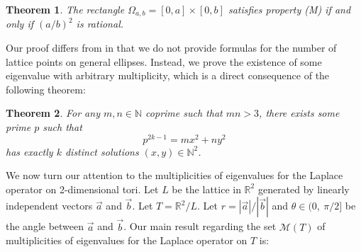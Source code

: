 \documentclass[11pt]{amsart}
\newtheorem{theorem}{Theorem}[section]
\theoremstyle{definition}
\def\sm{{\mathcal M}}
\def\R{{\mathbb R}}
\begin{document}
\begin{theorem}\label{M}
    The rectangle $\Omega_{a, b}=[0,a]\times[0,b]$ satisfies property (M) if and only if $(a/b)^2$ is rational.
\end{theorem}

Our proof differs from \cite{Heimrath} in that we do not provide formulas for the number of lattice points on general ellipses. Instead, we prove the existence of some eigenvalue with arbitrary multiplicity, which is a direct consequence of the following theorem:

\begin{theorem}\label{Q}
    For any $m,n\in\mathbb{N}$ coprime such that $mn>3$, there exists some prime $p$ such that \[p^{2k-1}=mx^2+ny^2\] has exactly $k$ distinct solutions $(x,y)\in\mathbb{N}^2$.
\end{theorem} 

We now turn our attention to the multiplicities of eigenvalues for the Laplace operator on 2-dimensional tori. Let $L$ be the lattice in $\R^2$ generated by linearly independent vectors $\vec{a}$ and $\vec{b}$. Let $T=\R^2/L$.  Let $r=|\vec{a}|/|\vec{b}|$ and $\theta\in (0, \ \pi/2]$ be the angle between $\vec{a}$ and $\vec{b}$. Our main result regarding the set $\sm(T)$ of multiplicities of eigenvalues for the Laplace operator on $T$ is:
\end{document}

